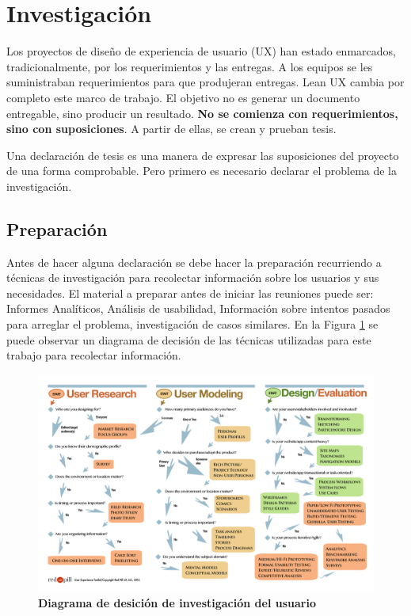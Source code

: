 \section{Investigación}

Los proyectos de diseño de experiencia de usuario (UX) han estado enmarcados, tradicionalmente, por los requerimientos y las entregas. A los equipos se les suministraban requerimientos para que produjeran entregas. Lean UX cambia por completo este marco de trabajo. El objetivo no es generar un documento entregable, sino producir un resultado. \textbf{No se comienza con requerimientos, sino con suposiciones}. A partir de ellas, se crean y prueban tesis. 

Una declaración de tesis es una manera de expresar las suposiciones del proyecto de una forma comprobable. Pero primero es necesario declarar el problema de la investigación.

\subsection{Preparación}
Antes de hacer alguna declaración se debe hacer la preparación recurriendo a técnicas de investigación para recolectar información sobre los usuarios y sus necesidades. El material a preparar antes de iniciar las reuniones puede ser: Informes Analíticos, Análisis de usabilidad, Información sobre intentos pasados para arreglar el problema, investigación de casos similares. 
En la Figura \ref{fig:diagrama-desicion} se puede observar un diagrama de decisión de las técnicas utilizadas para este trabajo para recolectar información.


\begin{figure}[h]
\includegraphics[width=16cm]{Img/CPD/3-FLOW.png}
\centering
\caption{\textbf{ \footnotesize{Diagrama de desición de investigación del usuario}}}
\label{fig:diagrama-desicion}
\end{figure}




